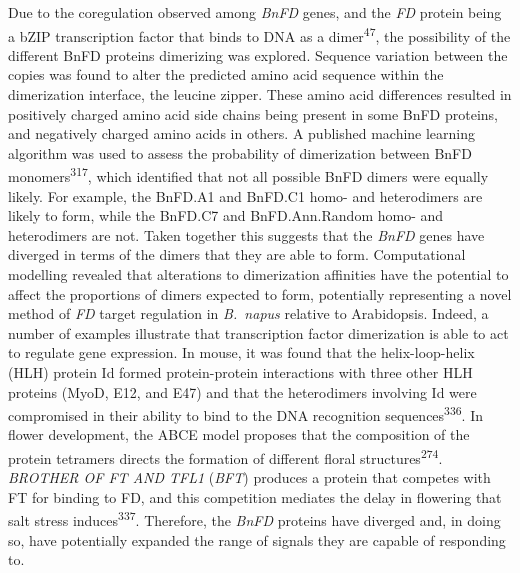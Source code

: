 \documentclass[12pt,]{book}
\begin{document}
Due to the coregulation observed among \emph{BnFD} genes, and the
\emph{FD} protein being a bZIP transcription factor that binds to DNA as
a dimer\textsuperscript{47}, the possibility of the different BnFD
proteins dimerizing was explored. Sequence variation between the copies
was found to alter the predicted amino acid sequence within the
dimerization interface, the leucine zipper. These amino acid differences
resulted in positively charged amino acid side chains being present in
some BnFD proteins, and negatively charged amino acids in others. A
published machine learning algorithm was used to assess the probability
of dimerization between BnFD monomers\textsuperscript{317}, which
identified that not all possible BnFD dimers were equally likely. For
example, the BnFD.A1 and BnFD.C1 homo- and heterodimers are likely to
form, while the BnFD.C7 and BnFD.Ann.Random homo- and heterodimers are
not. Taken together this suggests that the \emph{BnFD} genes have
diverged in terms of the dimers that they are able to form.
Computational modelling revealed that alterations to dimerization
affinities have the potential to affect the proportions of dimers
expected to form, potentially representing a novel method of \emph{FD}
target regulation in \emph{B.~napus} relative to Arabidopsis. Indeed, a
number of examples illustrate that transcription factor dimerization is
able to act to regulate gene expression. In mouse, it was found that the
helix-loop-helix (HLH) protein Id formed protein-protein interactions
with three other HLH proteins (MyoD, E12, and E47) and that the
heterodimers involving Id were compromised in their ability to bind to
the DNA recognition sequences\textsuperscript{336}. In flower
development, the ABCE model proposes that the composition of the protein
tetramers directs the formation of different floral
structures\textsuperscript{274}. \emph{BROTHER OF FT AND TFL1}
(\emph{BFT}) produces a protein that competes with FT for binding to FD,
and this competition mediates the delay in flowering that salt stress
induces\textsuperscript{337}. Therefore, the \emph{BnFD} proteins have
diverged and, in doing so, have potentially expanded the range of
signals they are capable of responding to.
\end{document}
